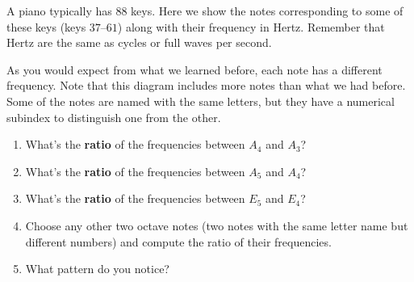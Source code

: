\documentclass[12pt,noauthor,nooutcomes,handout,hints]{ximera}
\begin{document}
\begin{question}
A piano typically has $88$ keys. Here we show the notes corresponding to some of these keys (keys $37$--$61$) along with their frequency in Hertz. Remember that Hertz are the same as cycles or full waves per second.
\noStaff



As you would expect from what we learned before, each note has a different frequency.  Note that this diagram includes more notes than what we had before. Some of the notes are named with the same letters, but they have a numerical subindex to distinguish one from the other.

\begin{enumerate}






\item What's the \textbf{ratio} of the frequencies between $A_4$ and $A_3$?

\answerspace


\item What's the \textbf{ratio} of the frequencies between $A_5$ and $A_4$?

\answerspace

\item What's the \textbf{ratio} of the frequencies between $E_5$ and $E_4$?

\answerspace

\item Choose any other two octave notes (two notes with the same letter name but different numbers) and compute the ratio of their frequencies.

\answerspace

\item What pattern do you notice?

\answerspace

\end{enumerate}
\end{question}
\end{document}
